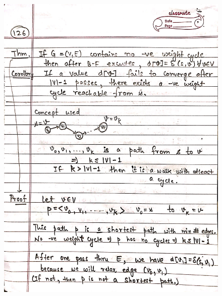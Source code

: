\begin{figure}[H]
    \centering
    \includegraphics[scale=0.25]{"./MIT-6.006/MIT-6006-126"}
\end{figure}
\newpage
